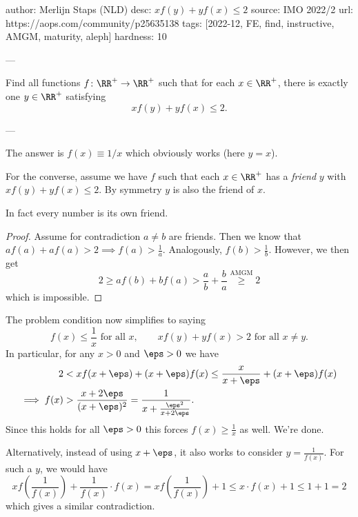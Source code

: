 author: Merlijn Staps (NLD)
desc: $xf(y)+yf(x) \le 2$
source: IMO 2022/2
url: https://aops.com/community/p25635138
tags: [2022-12, FE, find, instructive, AMGM, maturity, aleph]
hardness: 10

---

Find all functions $f \colon \RR^+ \to \RR^+$ such that for each $x \in \RR^+$,
there is exactly one $y \in \RR^+$ satisfying \[ xf(y)+yf(x) \leq 2. \]

---

The answer is $f(x) \equiv 1/x$ which obviously works (here $y=x$).

For the converse, assume we have $f$ such that
each $x \in \RR^+$ has a \emph{friend} $y$ with $xf(y)+yf(x)\le2$.
By symmetry $y$ is also the friend of $x$.

\begin{claim*}
  In fact every number is its own friend.
\end{claim*}
\begin{proof}
  Assume for contradiction $a \neq b$ are friends.
  Then we know that  $af(a) + af(a) > 2 \implies f(a) > \frac 1a$.
  Analogously, $f(b) > \frac 1b$.
  However, we then get
  \[ 2 \ge a f(b) + b f(a) > \frac ab + \frac ba \overset{\text{AMGM}}{\ge} 2 \]
  which is impossible.
\end{proof}

The problem condition now simplifies to saying
\[ f(x) \le \frac1x \text{ for all $x$}, \qquad
  xf(y) + yf(x) > 2 \text{ for all $x \neq y$}. \]
In particular, for any $x>0$ and $\eps > 0$ we have
\begin{align*}
  2 &< xf(x+\eps) + (x+\eps)f(x) \le \frac{x}{x+\eps} + (x+\eps) f(x) \\
  \implies f(x) &> \frac{x+2\eps}{(x+\eps)^2}
  = \frac{1}{x + \frac{\eps^2}{x+2\eps}}.
\end{align*}
Since this holds for all $\eps > 0$ this forces $f(x) \ge \frac1x$ as well.
We're done.

\begin{remark*}
  Alternatively, instead of using $x+\eps$,
  it also works to consider $y = \frac{1}{f(x)}$.
  For such a $y$, we would have
  \[ xf\left( \frac{1}{f(x)} \right) + \frac{1}{f(x)} \cdot f(x)
    = xf\left( \frac{1}{f(x)} \right) + 1
    \leq x \cdot f(x) + 1 \leq 1 + 1 = 2 \]
  which gives a similar contradiction.
\end{remark*}
